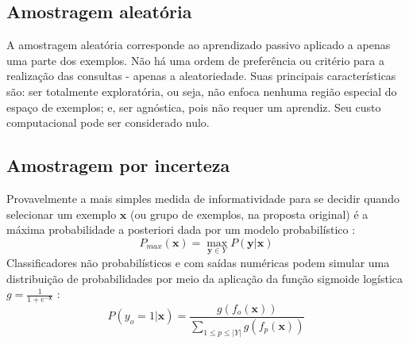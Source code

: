 %     
%




\subsection{Amostragem aleatória}
A amostragem aleatória corresponde ao aprendizado passivo aplicado a apenas
uma parte dos exemplos.
Não há uma ordem de preferência ou critério para a realização das
consultas - apenas a aleatoriedade.
Suas principais características são: ser totalmente exploratória, ou seja,
não enfoca nenhuma região especial do espaço de exemplos; e,
ser agnóstica, pois não requer um aprendiz.
Seu custo computacional pode ser considerado nulo.

\subsection{Amostragem por incerteza}\label{unc}
Provavelmente a mais simples medida de informatividade
para se decidir quando selecionar um exemplo $\bm{x}$
(ou grupo de exemplos, na proposta original) é a máxima probabilidade a posteriori
dada por um modelo probabilístico \citep{journals/sigir/Lewis95a}:
\begin{equation}
P_{max}(\bm{x})=\max_{\bm{y}\in Y}P(\bm{y}|\bm{x})
\end{equation}
Classificadores não probabilísticos e com saídas numéricas podem simular uma
distribuição de probabilidades por meio da aplicação da função sigmoide logística
$g=\frac{1}{1+e^{-\bm{x}}}$
:
\begin{equation} \label{eqprob}
 P(y_o=1|\bm{x}) = \frac{g(f_o(\bm{x}))}{\sum_{1 \leq p \leq |Y|}g(f_p(\bm{x})) }
\end{equation}

